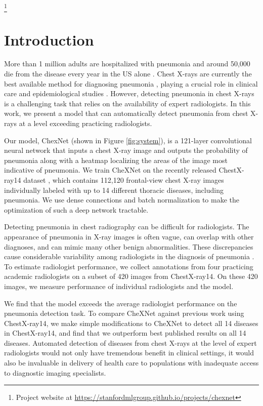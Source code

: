 \documentclass{article}
\begin{document}
{\let\thefootnote\relax\footnote{Project website at \url{https://stanfordmlgroup.github.io/projects/chexnet}}}

\section{Introduction}
More than 1 million adults are hospitalized with pneumonia and around 50,000 die from the disease every year in the US alone \citep{pneumonia_2017}. Chest X-rays are currently the best available method for diagnosing pneumonia \citep{world2001standardization}, playing a crucial role in clinical care \citep{franquet2001imaging} and epidemiological studies \citep{cherian2005standardized}. However, detecting pneumonia in chest X-rays is a challenging task that relies on the availability of expert radiologists. In this work, we present a model that can automatically detect pneumonia from chest X-rays at a level exceeding practicing radiologists.

Our model, ChexNet (shown in Figure \ref{fig:system}), is a 121-layer convolutional neural network that inputs a chest X-ray image and outputs the probability of pneumonia along with a heatmap localizing the areas of the image most indicative of pneumonia. We train CheXNet on the recently released ChestX-ray14 dataset \citep{Wang2017}, which contains 112,120 frontal-view chest X-ray images individually labeled with up to 14 different thoracic diseases, including pneumonia. We use dense connections \citep{Huang2016} and batch normalization \citep{Ioffe2015} to make the optimization of such a deep network tractable.

Detecting pneumonia in chest radiography can be difficult for radiologists. The appearance of pneumonia in X-ray images is often vague, can overlap with other diagnoses, and can mimic many other benign abnormalities. These discrepancies cause considerable variability among radiologists in the diagnosis of pneumonia \citep{neuman2012variability, davies1996reliability, hopstaken2004inter}. To estimate radiologist performance, we collect annotations from four practicing academic radiologists on a subset of 420 images from ChestX-ray14. On these 420 images, we measure performance of individual radiologists and the model.

We find that the model exceeds the average radiologist performance on the pneumonia detection task. To compare CheXNet against previous work using ChestX-ray14, we make simple modifications to CheXNet to detect all 14 diseases in ChestX-ray14, and find that we outperform best published results on all 14 diseases. Automated detection of diseases from chest X-rays at the level of expert radiologists would not only have tremendous benefit in clinical settings, it would also be invaluable in delivery of health care to populations with inadequate access to diagnostic imaging specialists.
\end{document}
